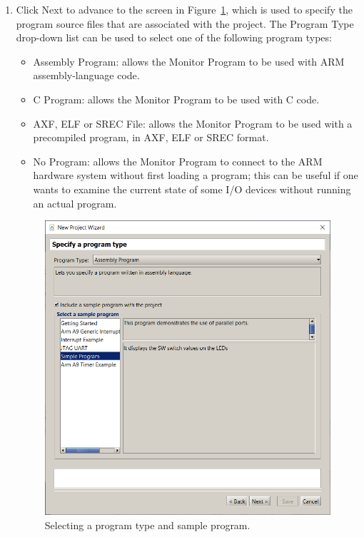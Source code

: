 \documentclass[11pt, twoside, pdftex]{article}
\begin{document}
\begin{enumerate}
\item
Click {\sf Next} to advance to the screen in Figure~\ref{fig:7},
which is used to specify the program source files that are associated with the project.
The {\sf Program Type} drop-down list can be used to select one of the following program types:

\begin{itemize}
\item {\sf Assembly Program}: allows the Monitor Program to be used with ARM assembly-language code.
\item {\sf C Program}: allows the Monitor Program to be used with
C code.
\item {\sf AXF, ELF or SREC File}: allows the Monitor Program to
be used with a precompiled program, in AXF, ELF or SREC format.
\item {\sf No Program}: allows the Monitor Program to connect to the ARM hardware system without first loading a program;
this can be useful if one wants to examine the current state of
some I/O devices without running an actual program.
\end{itemize}

\begin{figure}[H]
   \begin{center}
      \includegraphics[scale=0.65]{screenshots/figure7.png}
   \end{center}
   \caption{Selecting a program type and sample program.}
	 \label{fig:7}
\end{figure}


\end{enumerate}
\end{document}
